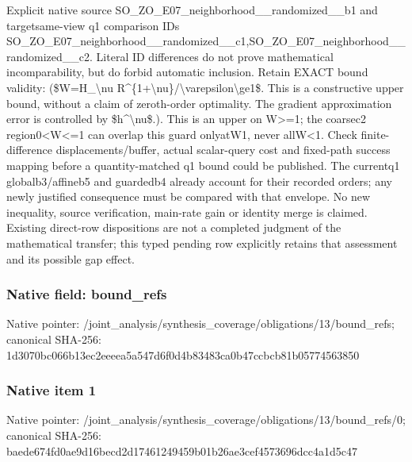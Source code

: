\documentclass[10pt,a4paper]{article}
\begin{document}
\begingroup\raggedright\sloppy Explicit native source SO\_\allowbreak{}ZO\_\allowbreak{}E07\_\allowbreak{}neighborhood\_\allowbreak{}\_\allowbreak{}randomized\_\allowbreak{}\_\allowbreak{}b1 and targetsame-view q1 comparison IDs SO\_\allowbreak{}ZO\_\allowbreak{}E07\_\allowbreak{}neighborhood\_\allowbreak{}\_\allowbreak{}randomized\_\allowbreak{}\_\allowbreak{}c1,\allowbreak{}SO\_\allowbreak{}ZO\_\allowbreak{}E07\_\allowbreak{}neighborhood\_\allowbreak{}\_\allowbreak{}randomized\_\allowbreak{}\_\allowbreak{}c2. Literal ID differences do not prove mathematical incomparability,\allowbreak{} but do forbid automatic inclusion. Retain EXACT bound validity:\allowbreak{} (\$W=\allowbreak{}H\_\allowbreak{}\textbackslash{}nu R\textasciicircum{}\{1+\textbackslash{}nu\}/\allowbreak{}\textbackslash{}varepsilon\textbackslash{}ge1\$. This is a constructive upper bound,\allowbreak{} without a claim of zeroth-order optimality. The gradient approximation error is controlled by \$h\textasciicircum{}\textbackslash{}nu\$.). This is an upper on W>=\allowbreak{}1;\allowbreak{} the coarsec2 region0<W<=\allowbreak{}1 can overlap this guard onlyatW1,\allowbreak{} never allW<1. Check finite-difference displacements/\allowbreak{}buffer,\allowbreak{} actual scalar-query cost and fixed-path success mapping before a quantity-matched q1 bound could be published. The currentq1 globalb3/\allowbreak{}affineb5 and guardedb4 already account for their recorded orders;\allowbreak{} any newly justified consequence must be compared with that envelope. No new inequality,\allowbreak{} source verification,\allowbreak{} main-rate gain or identity merge is claimed. Existing direct-row dispositions are not a completed judgment of the mathematical transfer;\allowbreak{} this typed pending row explicitly retains that assessment and its possible gap effect.\par\endgroup

\subsubsection{Native field: bound\_\allowbreak{}refs}
Native pointer: /joint\_\allowbreak{}analysis/synthesis\_\allowbreak{}coverage/obligations/13/bound\_\allowbreak{}refs; canonical SHA-256: 1d3070bc066b13ec2eeeea5a547d6f0d4b83483ca0b47ccbcb81b05774563850

\subsubsection{Native item 1}
Native pointer: /joint\_\allowbreak{}analysis/synthesis\_\allowbreak{}coverage/obligations/13/bound\_\allowbreak{}refs/0; canonical SHA-256: baede674fd0ae9d16becd2d17461249459b01b26ae3cef4573696dcc4a1d5c47
\end{document}
